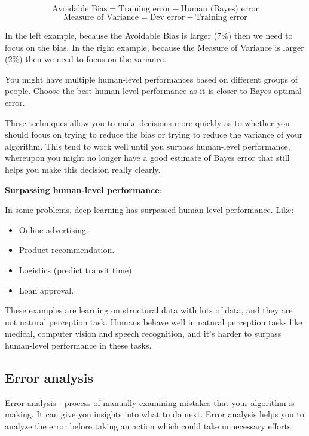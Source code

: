 \documentclass{article}
\begin{document}
\[\text{Avoidable Bias} = \text{Training error} - \text{Human (Bayes) error}\]
\[\text{Measure of Variance} = \text{Dev error} - \text{Training error}\]

\noindent In the left example, because the Avoidable Bias is larger (7\%) then we need to focus on the bias. In the right example, because the Measure of Variance is larger (2\%) then we need to focus on the variance.

\bigskip

\noindent You might have multiple human-level performances based on different groups of people. Choose the best human-level performance as it is closer to Bayes optimal error.

\bigskip

\noindent These techniques allow you to make decisions more quickly as to whether you should focus on trying to reduce the bias or trying to reduce the variance of your algorithm. This tend to work well until you surpass human-level performance, whereupon you might no longer have a good estimate of Bayes error that still helps you make this decision really clearly.

\bigskip

\noindent \textbf{Surpassing human-level performance}:

\noindent In some problems, deep learning has surpassed human-level performance. Like:

\begin{itemize}
    \item Online advertising.
    \item Product recommendation.
    \item Logistics (predict transit time)
    \item Loan approval.
\end{itemize}

\noindent These examples are learning on structural data with lots of data, and they are not natural perception task. Humans behave well in natural perception tasks like medical, computer vision and speech recognition, and it's harder to surpass human-level performance in these tasks.

\subsection{Error analysis}

\noindent Error analysis - process of manually examining mistakes that your algorithm is making. It can give you insights into what to do next. Error analysis helps you to analyze the error before taking an action which could take unnecessary efforts.
\end{document}
